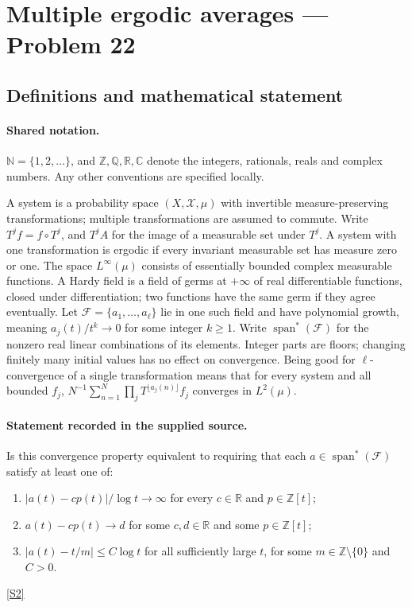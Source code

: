 \documentclass[11pt]{article}
\newcommand{\sref}[2]{\hyperlink{source:#1:#2}{[S#2]}}
\begin{document}
\section{Multiple ergodic averages — Problem 22}\label{statement}

\subsection{Definitions and mathematical statement}

\paragraph{Shared notation.}$\mathbb N=\{1,2,\ldots\}$, and $\mathbb Z,\mathbb Q,\mathbb R,\mathbb C$ denote the integers, rationals, reals and complex numbers. Any other conventions are specified locally.


A system is a probability space $(X,\mathcal X,\mu)$ with invertible measure-preserving transformations; multiple transformations are assumed to commute. Write $T^j f=f\circ T^j$, and $T^j A$ for the image of a measurable set under $T^j$. A system with one transformation is ergodic if every invariant measurable set has measure zero or one. The space $L^\infty(\mu)$ consists of essentially bounded complex measurable functions. A Hardy field is a field of germs at $+\infty$ of real differentiable functions, closed under differentiation; two functions have the same germ if they agree eventually. Let $\mathcal F=\{a_1,\ldots,a_\ell\}$ lie in one such field and have polynomial growth, meaning $a_j(t)/t^k\to0$ for some integer $k\ge1$. Write $\operatorname{span}^*(\mathcal F)$ for the nonzero real linear combinations of its elements. Integer parts are floors; changing finitely many initial values has no effect on convergence. Being good for $\ell$-convergence of a single transformation means that for every system and all bounded $f_j$, $N^{-1}\sum_{n=1}^N\prod_jT^{\lfloor a_j(n)\rfloor}f_j$ converges in $L^2(\mu)$.
\paragraph{Statement recorded in the supplied source.}
Is this convergence property equivalent to requiring that each $a\in\operatorname{span}^*(\mathcal F)$ satisfy at least one of: \begin{enumerate}\item $|a(t)-cp(t)|/\log t\to\infty$ for every $c\in\mathbb R$ and $p\in\mathbb Z[t]$;\item $a(t)-cp(t)\to d$ for some $c,d\in\mathbb R$ and some $p\in\mathbb Z[t]$;\item $|a(t)-t/m|\le C\log t$ for all sufficiently large $t$, for some $m\in\mathbb Z\setminus\{0\}$ and $C>0$.\end{enumerate} \sref{statement}{2}
\end{document}
